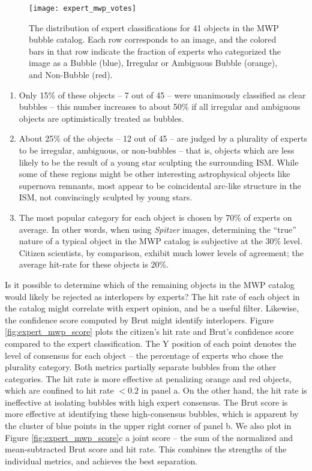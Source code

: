 \documentclass[preprint]{aastex}
\begin{document}
\begin{figure}[h!]
\texttt{[image: expert\_mwp\_votes]}
\caption{The distribution of expert classifications for 41 objects in the MWP bubble catalog. Each row corresponds to an image, and the colored bars in that row indicate the fraction of experts who categorized the image as a Bubble (blue), Irregular or Ambiguous Bubble (orange), and Non-Bubble (red).}
\label{fig:expert_mwp_votes}
\end{figure}

\begin{enumerate} 
\item Only 15\% of these objects -- 7 out of 45 -- were unanimously classified as clear bubbles -- this number increases to about 50\% if all irregular and ambiguous objects are optimistically treated as bubbles. 
\item About 25\% of the objects -- 12 out of 45 -- are judged by a plurality of experts to be irregular, ambiguous, or non-bubbles -- that is, objects which are less likely to be the result of a young star sculpting the surrounding ISM. While some of these regions might be other interesting astrophysical objects like supernova remnants, most appear to be coincidental arc-like structure in the ISM, not convincingly sculpted by young stars.
\item The most popular category for each object is chosen by 70\% of experts on average. In other words, when using \emph{Spitzer} images, determining the ``true'' nature of a typical object in the MWP catalog is subjective at the 30\% level. Citizen scientists, by comparison, exhibit much lower levels of agreement; the average hit-rate for these objects is 20\%.
\end{enumerate}

Is it possible to determine which of the remaining objects in the MWP catalog would likely be rejected as interlopers by experts? The hit rate of each object in the catalog might correlate with expert opinion, and be a useful filter. Likewise, the confidence score computed by Brut might identify interlopers. Figure \ref{fig:expert_mwp_score} plots the citizen's hit rate and Brut's confidence score compared to the expert classification. The Y position of each point denotes the level of consensus for each object -- the percentage of experts who chose the plurality category. Both metrics partially separate bubbles from the other categories. The hit rate is more effective at penalizing orange and red objects, which are confined to hit rate $<0.2$ in panel a. On the other hand, the hit rate is ineffective at isolating bubbles with high expert consensus. The Brut score is more effective at identifying these high-consensus bubbles, which is apparent by the cluster of blue points in the upper right corner of panel b. We also plot in Figure \ref{fig:expert_mwp_score}c a joint score -- the sum of the normalized and mean-subtracted Brut score and hit rate.  This combines the strengths of the individual metrics, and achieves the best separation.
\end{document}
